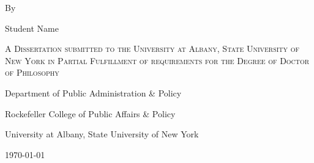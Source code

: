 \thispagestyle{empty}
\begin{titlepage}
	\centering
	
	{\LARGE \TheTitle \par}
	\vspace{1.5cm}
	
	{\large By \par}
	
	\vspace{2cm}
	{\Large Student Name \par}
	
    \vspace{2.5cm}
    {\scshape A Dissertation submitted to the University at Albany, State University of New York in Partial Fulfillment of requirements for the Degree of Doctor of Philosophy \par}
    
    \vspace{2cm}
    {Department of Public Administration \& Policy \par}
    \vspace{0.2cm}
    {Rockefeller College of Public Affairs \& Policy \par}
    \vspace{0.2cm}
    {University at Albany, State University of New York \par}

	\vfill
	{\large \today \par}
\end{titlepage}